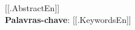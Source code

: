 \begin{resumo}[ABSTRACT]
\begin{SingleSpacing}

[[.AbstractEn]]\\

\textbf{Palavras-chave}: [[.KeywordsEn]]
\end{SingleSpacing}
\end{resumo}